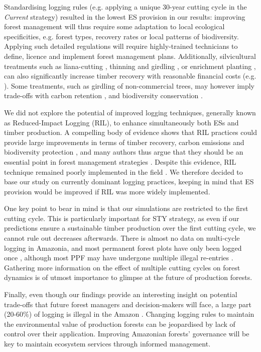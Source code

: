 \documentclass[12pt]{article}
\begin{document}
Standardising logging rules (e.g. applying a unique 30-year cutting cycle in the \textit{Current} strategy) resulted in the lowest ES provision in our results: improving forest management will thus require some adaptation to local ecological specificities, e.g. forest types, recovery rates or local patterns of biodiversity. Applying such detailed regulations will require highly-trained technicians to define, licence and implement forest management plans. Additionally, silvicultural treatments such as liana-cutting \cite{Mills2019}, thinning and girdling \cite{Pena-Claros2008}, or enrichment planting \cite{Schwartz2013,Navarro-Cerrillo2011}, can also significantly increase timber recovery with reasonable financial costs (e.g. \cite{Mills2019}). Some treatments, such as  girdling of non-commercial trees, may however imply trade-offs with carbon retention \cite{Roopsind2018}, and biodiversity conservation \cite{Ruslandi2017}. 

We did not explore the potential of improved logging techniques, generally known as Reduced-Impact Logging (RIL), to enhance simultaneously both ESs and timber production. A compelling body of evidence shows that RIL practices could provide large improvements in terms of timber recovery, carbon emissions and biodiversity protection \cite{Griscom2019,Putz2008c,Tobler2018,West2014}, and many authors thus argue that they should be an essential point in forest management strategies \cite{Griscom2018,Runting2018}. Despite this evidence, RIL technique remained poorly implemented in the field \cite{Ellis2019}. We therefore decided to base our study on currently dominant logging practices, keeping in mind that ES provision would be improved if RIL was more widely implemented.

One key point to bear in mind is that our simulations are restricted to the first cutting cycle. This is particularly important for STY strategy, as even if our predictions ensure a sustainable timber production over the first cutting cycle, we cannot rule out decreases afterwards. There is almost no data on multi-cycle logging in Amazonia, and most permanent forest plots have only been logged once \cite{Sist2015}, although most PPF may have undergone multiple illegal re-entries \cite{Tritsch2016a}. Gathering more information on the effect of multiple cutting cycles on forest dynamics is of utmost importance to glimpse at the future of production forests.

Finally, even though our findings provide an interesting insight on potential trade-offs that future forest managers and decision-makers will face, a large part (20-60\%) of logging is illegal in the Amazon \cite{Brancalion2018,Finer2014}. Changing logging rules to maintain the environmental value of production forests can be jeopardised by lack of control over their application. Improving Amazonian forests' governance will be key to maintain ecosystem services through informed management. 
\end{document}
